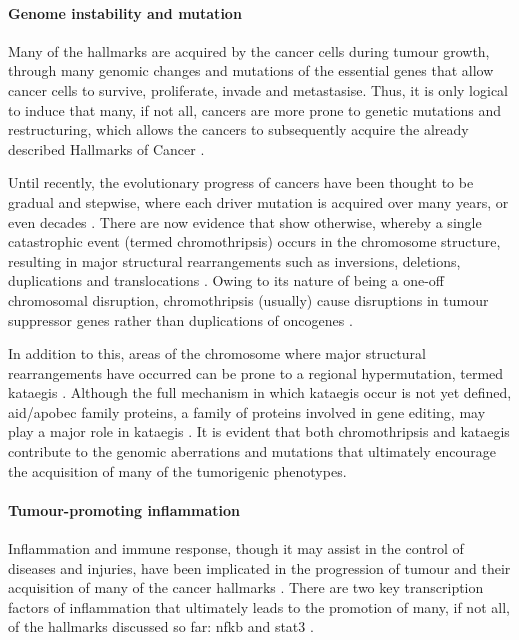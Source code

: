 \paragraph{Genome instability and mutation}

\noindent
Many of the hallmarks are acquired by the cancer cells during tumour growth, through many genomic changes and mutations of the essential genes that allow cancer cells to survive, proliferate, invade and metastasise.
Thus, it is only logical to induce that many, if not all, cancers are more prone to genetic mutations and restructuring, which allows the cancers to subsequently acquire the already described Hallmarks of Cancer \citep{Hanahan2011}.

Until recently, the evolutionary progress of cancers have been thought to be gradual and stepwise, where each driver mutation is acquired over many years, or even decades \citep{Stephens2011}.
There are now evidence that show otherwise, whereby a single catastrophic event (termed \gls{chromothripsis}) occurs in the chromosome structure, resulting in major structural rearrangements such as inversions, deletions, duplications and translocations \citep{Leibowitz2015,Stephens2011}.
Owing to its nature of being a one-off chromosomal disruption, \gls{chromothripsis} (usually) cause disruptions in tumour suppressor genes rather than duplications of oncogenes \citep{Leibowitz2015}.

In addition to this, areas of the chromosome where major structural rearrangements have occurred can be prone to a regional hypermutation, termed \gls{kataegis} \citep{Leibowitz2015,Nik-Zainal2012}.
Although the full mechanism in which \gls{kataegis} occur is not yet defined, \gls{aid}/\acrshort{apobec} family proteins, a family of proteins involved in gene editing, may play a major role in \gls{kataegis} \citep{Leibowitz2015,Nik-Zainal2012}.
It is evident that both \gls{chromothripsis} and \gls{kataegis} contribute to the genomic aberrations and mutations that ultimately encourage the acquisition of many of the tumorigenic phenotypes.

\paragraph{Tumour-promoting inflammation}

\noindent
Inflammation and immune response, though it may assist in the control of diseases and injuries, have been implicated in the progression of tumour and their acquisition of many of the cancer hallmarks \citep{Hanahan2011}.
There are two key transcription factors of inflammation that ultimately leads to the promotion  of many, if not all, of the hallmarks discussed so far: \gls{nfkb} and \gls{stat3} \citep{Mantovani2008}.

